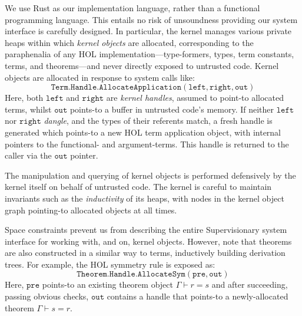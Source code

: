 \documentclass[sigplan, review]{acmart}
\begin{document}
We use Rust as our implementation language, rather than a functional programming language.
This entails no risk of unsoundness providing our system interface is carefully designed.
In particular, the kernel manages various private heaps within which \emph{kernel objects} are allocated, corresponding to the paraphenalia of any HOL implementation---type-formers, types, term constants, terms, and theorems---and never directly exposed to untrusted code.
Kernel objects are allocated in response to system calls like:
\begin{displaymath}
\mathtt{Term.Handle.AllocateApplication(left, right, out)}
\end{displaymath}
Here, both $\mathtt{left}$ and $\mathtt{right}$ are \emph{kernel handles}, assumed to point-to allocated terms, whilst $\mathtt{out}$ points-to a buffer in untrusted code's memory.
If neither $\mathtt{left}$ nor $\mathtt{right}$ \emph{dangle}, and the types of their referents match, a fresh handle is generated which points-to a new HOL term application object, with internal pointers to the functional- and argument-terms.
This handle is returned to the caller via the $\mathtt{out}$ pointer.

The manipulation and querying of kernel objects is performed defensively by the kernel itself on behalf of untrusted code.
The kernel is careful to maintain invariants such as the \emph{inductivity} of its heaps, with nodes in the kernel object graph pointing-to allocated objects at all times.

Space constraints prevent us from describing the entire Supervisionary system interface for working with, and on, kernel objects.
However, note that theorems are also constructed in a similar way to terms, inductively building derivation trees.
For example, the HOL symmetry rule is exposed as:
\begin{displaymath}
\mathtt{Theorem.Handle.AllocateSym(pre, out)}
\end{displaymath}
Here, $\mathtt{pre}$ points-to an existing theorem object $\Gamma \vdash r = s$ and after succeeding, passing obvious checks, $\mathtt{out}$ contains a handle that points-to a newly-allocated theorem $\Gamma \vdash s = r$.
\end{document}
